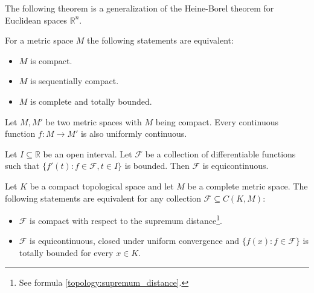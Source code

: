 	The following theorem is a generalization of the Heine-Borel theorem for Euclidean spaces $\mathbb{R}^n$.
	\begin{theorem}
		For a metric space $M$ the following statements are equivalent:
		\begin{itemize}
			\item $M$ is compact.
			\item $M$ is sequentially compact.
			\item $M$ is complete and totally bounded.
		\end{itemize}
	\end{theorem}

	\begin{theorem}
		Let $M, M'$ be two metric spaces with $M$ being compact. Every continuous function $f:M\rightarrow M'$ is also uniformly continuous.
	\end{theorem}



	\begin{property}
		Let $I\subseteq\mathbb{R}$ be an open interval. Let $\mathcal{F}$ be a collection of differentiable functions such that $\{f'(t):f\in\mathcal{F}, t\in I\}$ is bounded. Then $\mathcal{F}$ is equicontinuous.
	\end{property}

	\begin{theorem}
		Let $K$ be a compact topological space and let $M$ be a complete metric space. The following statements are equivalent for any collection $\mathcal{F}\subseteq C(K, M)$:
		\begin{itemize}
			\item $\mathcal{F}$ is compact with respect to the supremum distance\footnote{See formula \ref{topology:supremum_distance}.}.
			\item $\mathcal{F}$ is equicontinuous, closed under uniform convergence and $\{f(x):f\in\mathcal{F}\}$ is totally bounded for every $x\in K$.
		\end{itemize}
	\end{theorem}